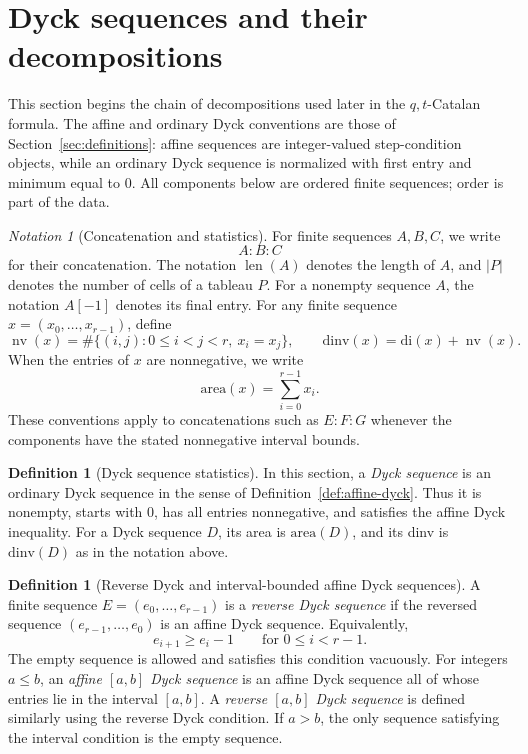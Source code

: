 \documentclass[11pt]{article}
\theoremstyle{plain}
\theoremstyle{definition}
\newtheorem{definition}[theorem]{Definition}
\theoremstyle{remark}
\newtheorem*{notation}{Notation}
\newcommand{\di}{\mathrm{di}}
\newcommand{\dinv}{\mathrm{dinv}}
\newcommand{\area}{\mathrm{area}}
\begin{document}
\section{Dyck sequences and their decompositions}
\label{sec:dyck-decompositions}
This section begins the chain of decompositions used later in the
\(q,t\)-Catalan formula.  The affine and ordinary Dyck conventions are those
of Section~\ref{sec:definitions}: affine sequences are integer-valued
step-condition objects, while an ordinary Dyck sequence is normalized with
first entry and minimum equal to \(0\).  All components below are ordered
finite sequences; order is part of the data.
\begin{notation}[Concatenation and statistics]
For finite sequences \(A,B,C\), we write
\[
  A:B:C
\]
for their concatenation.  The notation \(\operatorname{len}(A)\) denotes the
length of \(A\), and \(|P|\) denotes the number of cells of a tableau \(P\).
For a nonempty sequence \(A\), the notation \(A[-1]\) denotes its final
entry.
For any finite sequence \(x=(x_0,\ldots,x_{r-1})\), define
\[
  \operatorname{nv}(x)
  =\#\{(i,j):0\le i<j<r,\ x_i=x_j\},
  \qquad
  \dinv(x)=\di(x)+\operatorname{nv}(x).
\]
When the entries of \(x\) are nonnegative, we write
\[
  \area(x)=\sum_{i=0}^{r-1}x_i .
\]
These conventions apply to concatenations such as \(E:F:G\) whenever the
components have the stated nonnegative interval bounds.
\end{notation}
\begin{definition}[Dyck sequence statistics]
\label{def:section4-dyck-statistics}
In this section, a \emph{Dyck sequence} is an ordinary Dyck sequence in the
sense of Definition~\ref{def:affine-dyck}.  Thus it is nonempty, starts with
\(0\), has all entries nonnegative, and satisfies the affine Dyck inequality.
For a Dyck sequence \(D\), its area is \(\area(D)\), and its dinv is
\(\dinv(D)\) as in the notation above.
\end{definition}
\begin{definition}[Reverse Dyck and interval-bounded affine Dyck sequences]
\label{def:section4-bounded-dyck}
A finite sequence \(E=(e_0,\ldots,e_{r-1})\) is a \emph{reverse Dyck sequence}
if the reversed sequence \((e_{r-1},\ldots,e_0)\) is an affine Dyck sequence.
Equivalently,
\[
  e_{i+1}\ge e_i-1
  \qquad\text{for }0\le i<r-1.
\]
The empty sequence is allowed and satisfies this condition vacuously.
For integers \(a\le b\), an \emph{affine \([a,b]\) Dyck sequence} is an affine
Dyck sequence all of whose entries lie in the interval \([a,b]\).  A
\emph{reverse \([a,b]\) Dyck sequence} is defined similarly using the reverse
Dyck condition.  If \(a>b\), the only sequence satisfying the interval
condition is the empty sequence.
\end{definition}
\end{document}
